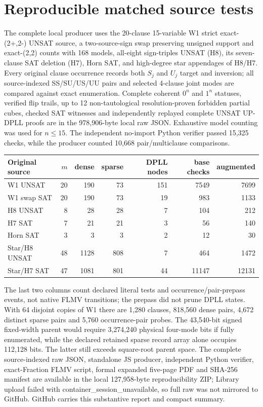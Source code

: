 \documentclass[11pt]{article}
\begin{document}
\section*{Reproducible matched source tests}
The complete local producer uses the 20-clause 15-variable W1 strict exact-(2+,2-) UNSAT source, a two-source-sign swap preserving unsigned support and exact-(2,2) counts with 168 models, all-eight sign-triples UNSAT (H8), its seven-clause SAT deletion (H7), Horn SAT, and high-degree star appendages of H8/H7. Every original clause occurrence records both $S_j$ and $U_j$ target and inversion; all source-indexed SS/SU/US/UU pairs and selected 4-clause joint modes are compared against exact enumeration. Complete coherent $0^n$ and $1^n$ statuses, verified flip trails, up to 12 non-tautological resolution-proven forbidden partial cubes, checked SAT witnesses and independently replayed complete UNSAT UP-DPLL proofs are in the 978,906-byte local raw JSON. Exhaustive model counting was used for $n\le15$. The independent no-import Python verifier passed 15,325 checks, while the producer counted 10,668 pair/multiclause comparisons.
\begin{center}\small\setlength{\tabcolsep}{4pt}\begin{tabular}{lrrrrrr}\toprule
Original source & $m$ & dense & sparse & DPLL nodes & base checks & augmented\\\midrule
W1 UNSAT &20&190&73&151&7549&7699\\
W1 swap SAT &20&190&73&19&983&1133\\
H8 UNSAT &8&28&28&7&104&212\\
H7 SAT &7&21&21&3&56&140\\
Horn SAT &3&3&3&2&12&30\\
Star/H8 UNSAT &48&1128&808&7&464&1472\\
Star/H7 SAT &47&1081&801&44&11147&12131\\\bottomrule
\end{tabular}\end{center}
The last two columns count declared literal tests and occurrence/pair-prepass events, not native FLMV transitions; the prepass did not prune DPLL states. With 64 disjoint copies of W1 there are 1,280 clauses, 818,560 dense pairs, 4,672 distinct sparse pairs and 5,760 occurrence-pair probes. The 43,540-bit signed fixed-width parent would require 3,274,240 physical four-mode bits if fully enumerated, while the declared retained sparse record array alone occupies 112,128 bits. The latter still exceeds square-root parent space. The complete source-indexed raw JSON, standalone JS producer, independent Python verifier, exact-Fraction FLMV script, formal expanded five-page PDF and SHA-256 manifest are available in the local 127,958-byte reproducibility ZIP; Library upload failed with container_session_unavailable, so full raw was not mirrored to GitHub. GitHub carries this substantive report and compact summary.
\end{document}
